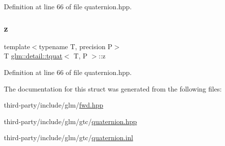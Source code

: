 Definition at line 66 of file quaternion.\+hpp.

\mbox{\label{structglm_1_1detail_1_1tquat_a65c2b0af6a4b59327015b766f25416ef}} 
\subsubsection{\texorpdfstring{z}{z}}
{\footnotesize\ttfamily template$<$typename T, precision P$>$ \\
T \hyperlink{structglm_1_1detail_1_1tquat}{glm\+::detail\+::tquat}$<$ T, P $>$\+::z}



Definition at line 66 of file quaternion.\+hpp.



The documentation for this struct was generated from the following files\+:\begin{DoxyCompactItemize}
\item 
third-\/party/include/glm/\hyperlink{fwd_8hpp}{fwd.\+hpp}\item 
third-\/party/include/glm/gtc/\hyperlink{gtc_2quaternion_8hpp}{quaternion.\+hpp}\item 
third-\/party/include/glm/gtc/\hyperlink{gtc_2quaternion_8inl}{quaternion.\+inl}\end{DoxyCompactItemize}
